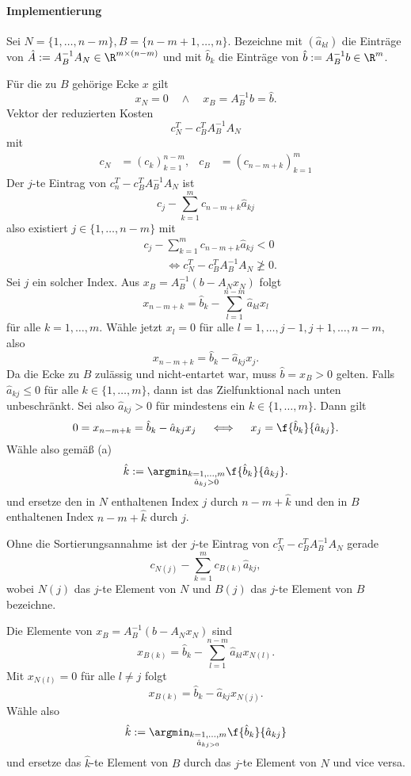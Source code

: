 \paragraph{Implementierung}

Sei \oBdA $N = \{1, \dotsc, n-m \}, B = \{n-m+1, \dotsc, n\}$.
Bezeichne mit $(\hat a_{kl})$ die Einträge von $\hat A := A_B^{-1} A_N \in \R^{m \times (n-m)}$ und mit $\hat b_k$ die Einträge von $\hat b := A_B^{-1}b \in \R^m$.

Für die zu $B$ gehörige Ecke $x$ gilt
\[
	x_N = 0
	\quad\land\quad
	x_B = A_B^{-1} b = \hat b.
\]
Vektor der reduzierten Kosten
\[
	c_N^T - c_B^T A_B^{-1} A_N
\]
mit
\begin{align*}
	c_N &= (c_k)_{k=1}^{n-m}, &
	c_B &= (c_{n-m+k})_{k=1}^{m}
\end{align*}
Der $j$-te Eintrag von $c_n^T - c_B^T A_B^{-1} A_N$ ist
\[
	c_j - \sum_{k=1}^m c_{n-m+k} \hat a_{kj}
\]
also existiert $j \in \{1, \dotsc, n-m \}$ mit
\begin{align*}
	&c_j - \sum_{k=1}^m c_{n-m+k} \hat a_{kj} < 0 \\
	&\qquad \iff c_N^T - c_B^T A_B^{-1} A_N \not\ge 0.
\end{align*}
Sei $j$ ein solcher Index.
Aus $x_B = A_B^{-1} (b - A_N x_N)$ folgt
\[
	x_{n-m+k} = \hat b_k - \sum_{l=1}^{n-m} \hat a_{kl} x_l
\]
für alle $k = 1, \dotsc, m$.
Wähle jetzt $x_l = 0$ für alle $l = 1, \dotsc, j-1, j+1, \dotsc, n-m$, also
\[
	x_{n-m+k} = \hat b_k - \hat a_{kj} x_j.
\]
Da die Ecke zu $B$ zulässig und nicht-entartet war, muss $\hat b = x_B > 0$ gelten.
Falls $\hat a_{kj} \le 0$ für alle $k \in \{1, \dotsc, m\}$, dann ist das Zielfunktional nach unten unbeschränkt.
Sei also $\hat a_{kj} > 0$ für mindestens ein $k \in \{1, \dotsc, m\}$.
Dann gilt
\[
	0 = x_{n-m+k}
	= \hat b_k - \hat a_{kj} x_j
	\quad\iff\quad
	x_j = \f {\hat b_k}{\hat a_{kj}}.
\]
Wähle also gemäß (a)
\[
	\hat k := \argmin_{\substack{k=1,\dotsc, m \\ \hat a_{kj} > 0}} \f {\hat b_k}{\hat a_{kj}}.
\]
und ersetze den in $N$ enthaltenen Index $j$ durch $n - m + \hat k$ und den in $B$ enthaltenen Index $n - m + \hat k$ durch $j$.

\begin{nt} \label{3.10}
	Ohne die Sortierungsannahme ist der $j$-te Eintrag von $c_N^T - c_B^T A_B^{-1} A_N$ gerade
	\[
		c_{N(j)} - \sum_{k=1}^m c_{B(k)} \hat a_{kj},
	\]
	wobei $N(j)$ das $j$-te Element von $N$ und $B(j)$ das $j$-te Element von $B$ bezeichne.

	Die Elemente von $x_B = A_B^{-1} (b - A_N x_N)$ sind
	\[
		x_{B(k)} = \hat b_k - \sum_{l=1}^{n-m} \hat a_{kl} x_{N(l)}.
	\]
	Mit $x_{N(l)} = 0$ für alle $l \neq j$ folgt
	\[
		x_{B(k)} = \hat b_k - \hat a_{kj} x_{N(j)}.
	\]
	Wähle also
	\[
		\hat k := \argmin_{\substack{k=1,\dotsc,m \\ \hat a_{kj > 0}}} \f {\hat b_{k}}{\hat a_{kj}}
	\]
	und ersetze das $\hat k$-te Element von $B$ durch das $j$-te Element von $N$ und vice versa.
\end{nt}

